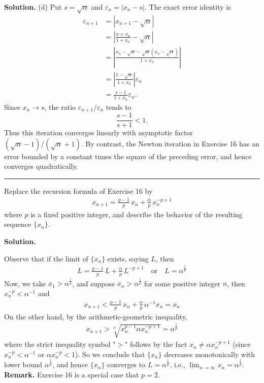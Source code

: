 \documentclass[12pt]{article}
\theoremstyle{definition}
\begin{document}
\smallskip
\noindent\textbf{Solution.}\quad
(d) Put $s=\sqrt{\alpha}$ and $\varepsilon_n=|x_n-s|$.  The exact error identity is
\begin{align*}
\varepsilon_{n+1}
&=\left\vert x_{n+1}-\sqrt{\alpha}\right\vert \\
&=\left\vert \frac{\alpha+x_n}{1+x_n}-\sqrt{\alpha}\right\vert \\
&=\left\vert \frac{x_n-\sqrt{\alpha}-\sqrt{\alpha}\left(x_n-\sqrt{\alpha}\right)}{1+x_n}\right\vert \\
&=\left\vert \frac{1-\sqrt{\alpha}}{1+x_n}\right\vert\varepsilon_n \\
&=\frac{s-1}{1+x_n}\varepsilon_n.
\end{align*}
Since $x_n\to s$, the ratio $\varepsilon_{n+1}/\varepsilon_n$ tends to
\[
 \frac{s-1}{s+1}<1.
\]
Thus this iteration converges linearly with asymptotic factor
$(\sqrt\alpha-1)/(\sqrt\alpha+1)$.  By contrast, the Newton iteration
in Exercise 16 has an error bounded by a constant times the square of
the preceding error, and hence converges quadratically.



\bigskip\noindent\hrule\bigskip

Replace the recursion formula of Exercise 16 by
\begin{align*}
x_{n+1}=\frac{p-1}{p}\,x_n+\frac{\alpha}{p}\,x_n^{-p+1}
\end{align*}
where $p$ is a fixed positive integer, and describe the behavior of the resulting sequence $\{x_n\}$.

\smallskip
\noindent\textbf{Solution.}\quad

Observe that if the limit of $\{x_n\}$ exists, saying $L$, then
\begin{align*}
L=\frac{p-1}{p}\,L+\frac{\alpha}{p}\,L^{-p+1}\quad\mbox{or}\quad
L=\alpha^{\frac{1}{p}}
\end{align*}
Now, we take $x_1>\alpha^{\frac{1}{p}}$, and suppose $x_n>\alpha^{\frac{1}{p}}$ for some positive integer $n$, then $x_n^{-p}<\alpha^{-1}$ and
\begin{align*}
x_{n+1}
<\frac{p-1}{p}\,x_n+\frac{\alpha}{p}\,\alpha^{-1}x_n
=x_n
\end{align*}
On the other hand, by the arithmetic-geometric inequality,
\begin{align*}
x_{n+1}
>\sqrt[p]{x_n^{p-1}\alpha x_n^{-p+1}}
=\alpha^{\frac{1}{p}}
\end{align*}
where the strict inequality symbol "$>$" follows by the fact $x_n\ne\alpha x_n^{-p+1}$ (since $x_n^{-p}<\alpha^{-1}$ or $\alpha x_n^{-p}<1$). So we conclude that $\{x_n\}$ decreases monotonically with lower bound $\alpha^{\frac{1}{p}}$, and hence $\{x_n\}$ converges to $L=\alpha^{\frac{1}{p}}$, i.e., $\lim_{n\to\infty}x_n=\alpha^{\frac{1}{p}}$.
\textbf{Remark.} Exercise 16 is a special case that $p=2$.
\end{document}
